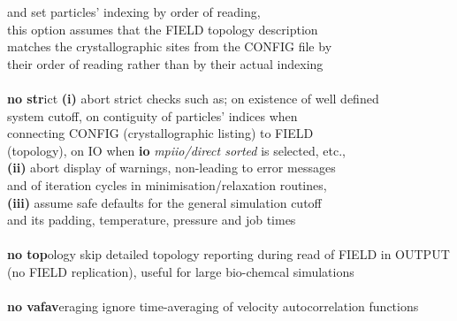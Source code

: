 \begin{tabbing}
\>                                              \> and set particles' indexing by order of reading, \\
\>                                              \> this option assumes that the FIELD topology description \\
\>                                              \> matches the crystallographic sites from the CONFIG file by \\
\>                                              \> their order of reading rather than by their actual indexing \\
\>                                              \> \\
\> {\bf no str}ict                              \> {\bf (i)} abort strict checks such as; on existence of well defined \\
\>                                              \> system cutoff, on contiguity of particles' indices when \\
\>                                              \> connecting CONFIG (crystallographic listing) to FIELD \\
\>                                              \> (topology), on IO when {\bf io} {\em mpiio/direct sorted} is selected, etc., \\
\>                                              \> {\bf (ii)} abort display of warnings, non-leading to error messages \\
\>                                              \> and of iteration cycles in minimisation/relaxation routines, \\
\>                                              \> {\bf (iii)} assume safe defaults for the general simulation cutoff \\
\>                                              \> and its padding, temperature, pressure and job times \\
\>                                              \> \\
\> {\bf no top}ology                            \> skip detailed topology reporting during read of FIELD in OUTPUT \\
\>                                              \> (no FIELD replication), useful for large bio-chemcal simulations \\
\>                                              \> \\
\> {\bf no vafav}eraging                        \> ignore time-averaging of velocity autocorrelation functions \\

\end{tabbing}
